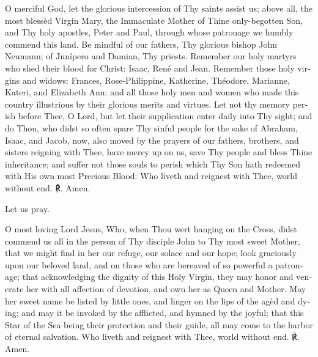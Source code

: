 \begin{otherlanguage}{english}


O merciful God, let the glorious intercession of Thy saints assist us; above all, the most blessèd Virgin Mary, the Immaculate Mother of Thine only-begotten Son, and Thy holy apostles, Peter and Paul, through whose patronage we humbly commend this land. Be mindful of our fathers, Thy glorious bishop John Neumann; of Junípero and Damian, Thy priests. Remember our holy martyrs who shed their blood for Christ: Isaac, René and Jean. Remember those holy virgins and widows: Frances, Rose-Philippine, Katherine, Théodore, Marianne, Kateri, and Elizabeth Ann; and all those holy men and women who made this country illustrious by their glorious merits and virtues. Let not thy memory perish before Thee, O Lord, but let their supplication enter daily into Thy sight; and do Thou, who didst so often spare Thy sinful people for the sake of Abraham, Isaac, and Jacob, now, also moved by the prayers of our fathers, brothers, and sisters reigning with Thee, have mercy up on us, save Thy people and bless Thine inheritance; and suffer not those souls to perish which Thy Son hath redeemed with His own most Precious Blood: Who liveth and reignest with Thee, world without end. ℟. Amen.
\smallskip

Let us pray.

O most loving Lord Jesus, Who, when Thou wert hanging on the Cross, didst commend us all in the person of Thy disciple John to Thy most sweet Mother, that we might find in her our refuge, our solace and our hope; look graciously upon our beloved land, and on those who are bereaved of so powerful a patronage; that acknowledging the dignity of this Holy Virgin, they may honor and venerate her with all affection of devotion, and own her as Queen and Mother. May her sweet name be listed by little ones, and linger on the lips of the agèd and dying; and may it be invoked by the afflicted, and hymned by the joyful; that this Star of the Sea being their protection and their guide, all may come to the harbor of eternal salvation. Who liveth and reignest with Thee, world without end. ℟. Amen.\end{otherlanguage}